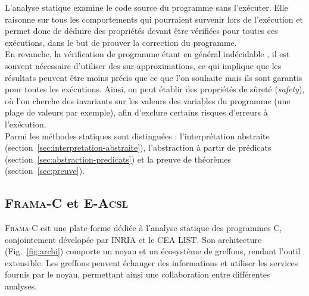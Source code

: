 L'analyse statique \cite{static-analysis} examine le code source du programme
sans l'exécuter. Elle raisonne sur tous les comportements qui pourraient
survenir lors de l'exécution et permet donc de déduire des propriétés devant
être vérifiées pour toutes ces exécutions, dans le but de prouver la correction
du programme.\\

En revanche, la vérification de programme étant en général indécidable
\cite{undecidability}, il est souvent nécessaire d'utiliser des
sur-approximations, ce qui implique que les résultats peuvent être moins précis
que ce que l'on souhaite mais ils sont garantis pour toutes les exécutions.
Ainsi, on peut établir des propriétés de sûreté ({\em safety}), où l’on cherche
des invariants sur les valeurs des variables du programme (une plage de valeurs
par exemple), afin d'exclure certains risques d'erreurs à l'exécution.\\

Parmi les méthodes statiques sont distinguées : l'interprétation abstraite
(section~\ref{sec:interpretation-abstraite}), l'abstraction à partir de
prédicats (section~\ref{sec:abstraction-predicats}) et la preuve de théorèmes
(section~\ref{sec:preuve}).



\subsection{\textsc{Frama-C} et \textsc{E-Acsl}}


\textsc{Frama-C} \cite{Frama-C} est une plate-forme dédiée à l'analyse statique
des programmes C, conjointement dévelopée par INRIA et le CEA LIST. Son
architecture (Fig.~\ref{fig:archi}) comporte un noyau et un écosystème de
greffons, rendant l’outil extensible. Les greffons peuvent échanger des
informations et utiliser les  services fournis par le noyau, permettant ainsi
une collaboration entre différentes analyses.\\


\newcommand{\lang}[1]{\textsf{\small #1}\xspace}
\newcommand{\cil}{\lang{CIL}}
\newcommand{\C}{\lang{C}}
\newcommand{\ACSL}{\lang{ACSL}}
\newcommand{\JML}{\lang{JML}}
\newcommand{\framac}{\lang{Frama-C}}
\newcommand{\pathcrawler}{\lang{PathCrawler}}
\newcommand{\colibri}{\lang{Colibri}}


